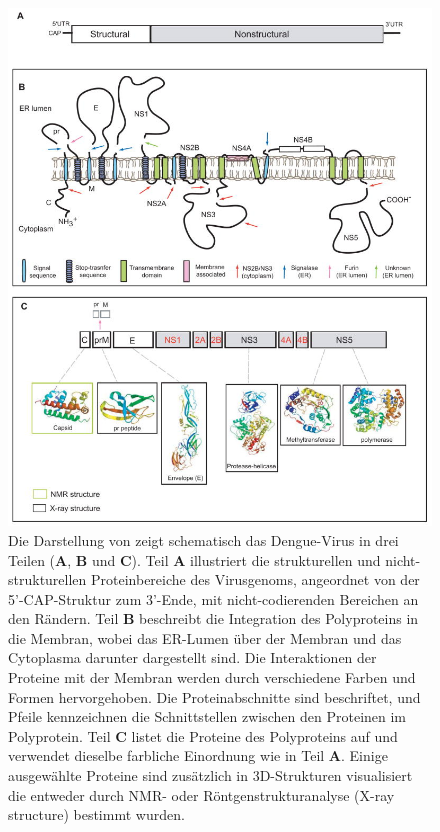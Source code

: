 \documentclass[german,version-2022-01]{uzl-thesis}
\begin{document}
\begin{figure}[tbp]
  \centering
  \includegraphics[scale=1]{Images/Dengue_virus_overview.jpg}
  \caption{Die Darstellung von \citeauthor{perera_structural_2008} \cite{perera_structural_2008} zeigt schematisch das Dengue-Virus in drei Teilen (\textbf{A}, \textbf{B} und \textbf{C}). Teil \textbf{A} illustriert die strukturellen und nicht-strukturellen Proteinbereiche des Virusgenoms, angeordnet von der 5'-CAP-Struktur zum 3'-Ende, mit nicht-codierenden Bereichen an den R\"andern. Teil \textbf{B} beschreibt die Integration des Polyproteins in die Membran, wobei das ER-Lumen \"uber der Membran und das Cytoplasma darunter dargestellt sind. Die Interaktionen der Proteine mit der Membran werden durch verschiedene Farben und Formen hervorgehoben. Die Proteinabschnitte sind beschriftet, und Pfeile kennzeichnen die Schnittstellen zwischen den Proteinen im Polyprotein. Teil \textbf{C} listet die Proteine des Polyproteins auf und verwendet dieselbe farbliche Einordnung wie in Teil \textbf{A}. Einige ausgew\"ahlte Proteine sind zus\"atzlich in 3D-Strukturen visualisiert die entweder durch NMR- oder R\"ontgenstrukturanalyse (X-ray structure) bestimmt wurden.}
  \label{fig:Dengue_virus_overview}
\end{figure} 
\end{document}
